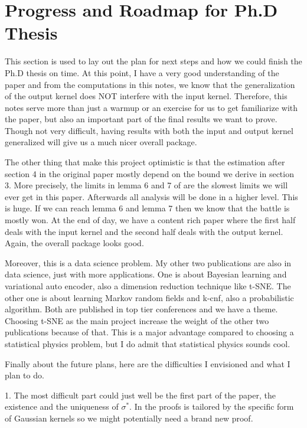 \documentclass[10pt]{article}
\newenvironment{Proof of lemma}{\noindent{\bf Proof of Lemma}}{\hfill$\Box$\newline}
\newenvironment{Proof of claim}{\noindent{\bf Proof of claim}}{\hfill$\Box$\newline}
\newenvironment{Proof of theorem}{\noindent{\bf Proof of Theorem}}{\hfill\scriptsize{$\Box$}\newline}
\newenvironment{Proof of theorems}{\noindent{\bf Proof of Theorems}}{\hfill$\Box$\newline}
\newenvironment{Proof of proposition}{\noindent{\bf Proof of Proposition}}{\hfill$\Box$\newline}
\newenvironment{Proof of propositions}{\noindent{\bf Proof of Propositions}}{\hfill$\Box$\newline}
\newenvironment{Proof of exercise}{\noindent{\it Proof of Exercise:}}{\hfill$\Box$}
\numberwithin{equation}{section}
\begin{document}
\section{Progress and Roadmap for Ph.D Thesis}
This section is used to lay out the plan for next steps and how we could finish
the Ph.D thesis on time. At this point, I have a very good understanding of the
paper and from the computations in this notes, we know that the generalization
of the output kernel does NOT interfere with the input kernel. Therefore, this
notes serve more than just a warmup or an exercise for us to get familiarize
with the paper, but also an important part of the final results we want to prove.
Though not very difficult, having results with both the input and output kernel
generalized will give us a much nicer overall package.

The other thing that make this project optimistic is that the estimation after
section 4 in the original paper mostly depend on the bound we derive in section
3. More precisely, the limits in lemma 6 and 7 of \cite{auffinger-tsne} are the
slowest limits we will ever get in this paper. Afterwards all analysis will be
done in a higher level. This is huge. If we can reach lemma 6 and lemma 7 then
we know that the battle is mostly won. At the end of day, we have a content
rich paper where the first half deals with the input kernel and the second half
deals with the output kernel. Again, the overall package looks good.

Moreover, this is a data science problem. My other two publications are also in
data science, just with more applications. One is about Bayesian learning and
variational auto encoder, also a dimension reduction technique like t-SNE. The
other one is about learning Markov random fields and k-cnf, also a
probabilistic algorithm. Both are published in top tier conferences and we have
a theme. Choosing t-SNE as the main project increase the weight of the other
two publications because of that. This is a major advantage compared to
choosing a statistical physics problem, but I do admit that statistical physics
sounds cool.

Finally about the future plans, here are the difficulties I envisioned and what
I plan to do.

1. The most difficult part could just well be the first part of the paper, the existence and the uniqueness of $\sigma^*$. In \cite{auffinger-tsne} the proofs is tailored by the specific form of Gaussian kernels so we might potentially need a brand new proof.
\end{document}
